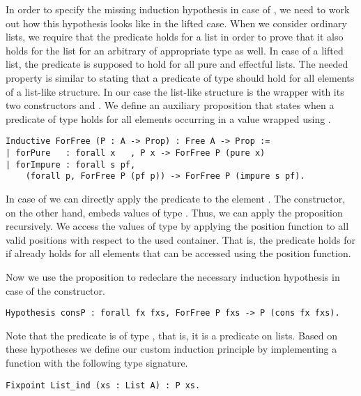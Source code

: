 In order to specify the missing induction hypothesis in case of , we need to work out how this hypothesis looks like in the lifted case.
When we consider ordinary lists, we require that the predicate holds for a list  in order to prove that it also holds for the list  for an arbitrary  of appropriate type as well.
In case of a lifted list, the predicate is supposed to hold for all
pure and effectful lists.
The needed property is similar to stating that a predicate of type  should hold for all elements of a list-like structure.
In our case the list-like structure is the  wrapper with its two constructors  and .
We define an auxiliary proposition  that states when a predicate of type  holds for all elements occurring in a value wrapped using .

\begin{verbatim}
Inductive ForFree (P : A -> Prop) : Free A -> Prop :=
| forPure   : forall x   , P x -> ForFree P (pure x)
| forImpure : forall s pf,
    (forall p, ForFree P (pf p)) -> ForFree P (impure s pf).
\end{verbatim}

In case of  we can directly apply the predicate to the element .
The  constructor, on the other hand, embeds values of type .
Thus, we can apply the proposition  recursively.
We access the values of type  by applying the position function to all valid positions with respect to the used container.
That is, the predicate holds for  if  already holds for all elements that can be accessed using the position function.

Now we use the proposition  to redeclare the necessary induction hypothesis in case of the  constructor.

\begin{verbatim}
Hypothesis consP : forall fx fxs, ForFree P fxs -> P (cons fx fxs).
\end{verbatim}

Note that the predicate  is of type , that is, it is a predicate on lists.
Based on these hypotheses we define our custom induction principle by implementing a function with the following type signature.

\begin{verbatim}
Fixpoint List_ind (xs : List A) : P xs.
\end{verbatim}

